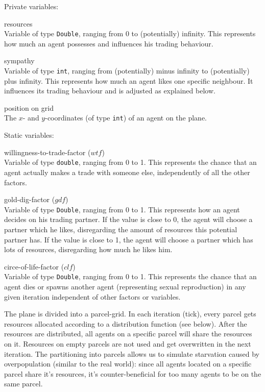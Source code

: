 \documentclass{JASSS}
\begin{document}
Private variables:
\begin{description*}
	\item[resources]\text{}\\
		Variable of type \texttt{Double}, ranging from 0 to (potentially) infinity. This represents how much an agent possesses and influences his trading behaviour.

	\item[sympathy]\text{}\\
		Variable of type \texttt{int}, ranging from (potentially) minus infinity to (potentially) plus infinity. This represents how much an agent likes one specific neighbour. It influences its trading behaviour and is adjusted as explained below.

	\item[position on grid]\text{}\\
		The $x$- and $y$-coordinates (of type \texttt{int}) of an agent on the plane.
\end{description*}

Static variables:
\begin{description*}
	\item[willingness-to-trade-factor ($wtf$)]\text{}\\
		Variable of type \texttt{double}, ranging from 0 to 1. This represents the chance that an agent actually makes a trade with someone else, independently of all the other factors.

	\item[gold-dig-factor ($gdf$)]\text{}\\
		Variable of type \texttt{Double}, ranging from 0 to 1. This represents how an agent decides on his trading partner. If the value is close to 0, the agent will choose a partner which he likes, disregarding the amount of resources this potential partner has. If the value is close to 1, the agent will choose a partner which has lots of resources, disregarding how much he likes him.

	\item[circe-of-life-factor ($clf$)]\text{}\\
		Variable of type \texttt{Double}, ranging from 0 to 1. This represents the chance that an agent dies or spawns another agent (representing sexual reproduction) in any given iteration independent of other factors or variables.
\end{description*}

The plane is divided into a parcel-grid. In each iteration (tick), every parcel gets resources allocated according to a distribution function (see below). After the resources are distributed, all agents on a specific parcel will share the resources on it. Resources on empty parcels are not used and get overwritten in the next iteration. The partitioning into parcels allows us to simulate starvation caused by overpopulation (similar to the real world): since all agents located on a specific parcel share it's resources, it's counter-beneficial for too many agents to be on the same parcel.\\
\end{document}
